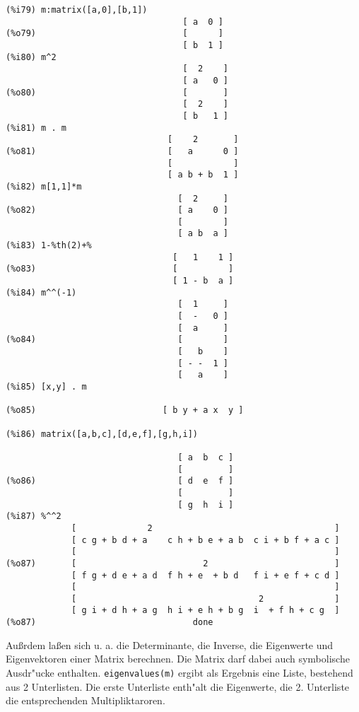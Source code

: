 \documentclass[spanish,12pt,a4paper]{article}
\begin{document}
\scriptsize
\begin{verbatim}
(%i79) m:matrix([a,0],[b,1])
                                   [ a  0 ]
(%o79)                             [      ]
                                   [ b  1 ]
(%i80) m^2
                                   [  2    ]
                                   [ a   0 ]
(%o80)                             [       ]
                                   [  2    ]
                                   [ b   1 ]
(%i81) m . m
                                [    2       ]
(%o81)                          [   a      0 ]
                                [            ]
                                [ a b + b  1 ]
(%i82) m[1,1]*m
                                  [  2     ]
(%o82)                            [ a    0 ]
                                  [        ]
                                  [ a b  a ]
(%i83) 1-%th(2)+%
                                 [   1    1 ]
(%o83)                           [          ]
                                 [ 1 - b  a ]
(%i84) m^^(-1)
                                  [  1     ]
                                  [  -   0 ]
                                  [  a     ]
(%o84)                            [        ]
                                  [   b    ]
                                  [ - -  1 ]
                                  [   a    ]
(%i85) [x,y] . m

(%o85)                         [ b y + a x  y ]

(%i86) matrix([a,b,c],[d,e,f],[g,h,i])

                                  [ a  b  c ]
                                  [         ]
(%o86)                            [ d  e  f ]
                                  [         ]
                                  [ g  h  i ]
(%i87) %^^2
             [              2                                    ]
             [ c g + b d + a    c h + b e + a b  c i + b f + a c ]
             [                                                   ]
(%o87)       [                         2                         ]
             [ f g + d e + a d  f h + e  + b d   f i + e f + c d ]
             [                                                   ]
             [                                    2              ]
             [ g i + d h + a g  h i + e h + b g  i  + f h + c g  ]
(%o87)                               done
\end{verbatim}
\normalsize

Au{\ss}rdem la{\ss}en sich u. a. die Determinante, die Inverse, die Eigenwerte und Eigenvektoren einer Matrix berechnen. Die Matrix darf dabei auch symbolische Ausdr"ucke enthalten.
\verb|eigenvalues(m)| ergibt als Ergebnis eine Liste, bestehend aus 2 Unterlisten. Die erste Unterliste enth"alt die Eigenwerte, die 2. Unterliste die entsprechenden Multipliktaroren.
\end{document}
